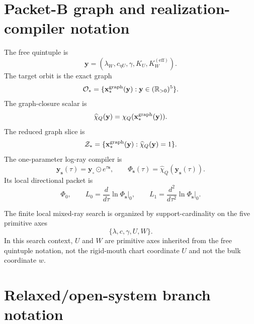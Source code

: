 \section{Packet-B graph and realization-compiler notation}
\label{sec:packet-b-realization-notation}

The free quintuple is
\begin{equation}
  \mathbf y=(\lambda_W,c_{\eta U},\gamma,K_U,K_W^{(\mathrm{eff})}).
\end{equation}
The target orbit is the exact graph
\begin{equation}
  \mathcal O_*
  =
  \{\mathbf x_*^{\rm graph}(\mathbf y):\mathbf y\in(\mathbb R_{>0})^5\}.
\end{equation}
The graph-closure scalar is
\begin{equation}
  \widehat\chi_Q(\mathbf y)=\chi_Q(\mathbf x_*^{\rm graph}(\mathbf y)).
\end{equation}
The reduced graph slice is
\begin{equation}
  \mathcal Z_*
  =
  \{\mathbf x_*^{\rm graph}(\mathbf y):\widehat\chi_Q(\mathbf y)=1\}.
\end{equation}
The one-parameter log-ray compiler is
\begin{equation}
  \mathbf y_{\mathbf s}(\tau)=\mathbf y_\circ\odot e^{\tau\mathbf s},
  \qquad
  \Phi_{\mathbf s}(\tau)=\widehat\chi_Q(\mathbf y_{\mathbf s}(\tau)).
\end{equation}
Its local directional packet is
\begin{equation}
  \Phi_0,
  \qquad
  L_0=\frac{d}{d\tau}\ln\Phi_{\mathbf s}\bigg|_0,
  \qquad
  L_1=\frac{d^2}{d\tau^2}\ln\Phi_{\mathbf s}\bigg|_0.
\end{equation}

The finite local mixed-ray search is organized by support-cardinality on the five primitive axes
\begin{equation}
  \{\lambda,c,\gamma,U,W\}.
\end{equation}
In this search context, \(U\) and \(W\) are primitive axes inherited from the free quintuple notation, not the rigid-mouth chart coordinate \(U\) and not the bulk coordinate \(w\).

\section{Relaxed/open-system branch notation}
\label{sec:relaxed-branch-notation}

